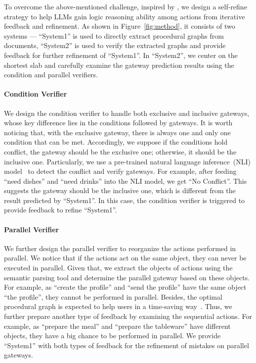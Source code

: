 To overcome the above-mentioned challenge, inspired by \citet{nye2021improving, madaan2023self}, we design a self-refine strategy to help LLMs gain logic reasoning ability among actions from iterative feedback and refinement. As shown in Figure~\ref{fig:method}, it consists of two systems --- ``System1'' is used to directly extract procedural graphs from documents, ``System2'' is used to verify the extracted graphs and provide feedback for further refinement of ``System1''. In ``System2'', we center on the shortest slab and carefully examine the gateway prediction results using the condition and parallel verifiers.

\paragraph{Condition Verifier}
 We design the condition verifier to handle both exclusive and inclusive gateways, whose key difference lies in the conditions followed by gateways. It is worth noticing that, with the exclusive gateway, there is always one and only one condition that can be met. Accordingly, we suppose if the conditions hold conflict, the gateway should be the exclusive one; otherwise, it should be the inclusive one. Particularly, we use a pre-trained natural language inference~(NLI) model~\cite{liu2019roberta} to detect the conflict and verify gateways. For example, after feeding ``need dishes'' and ``need drinks'' into the NLI model, we get ``No Conflict''. This suggests the gateway should be the inclusive one, which is different from the result predicted by ``System1''. In this case, the condition verifier is triggered to provide feedback to refine ``System1''.
%
\paragraph{Parallel Verifier}
 We further design the parallel verifier to reorganize the actions performed in parallel. We notice that if the actions act on the same object, they can never be executed in parallel. Given that, we extract the objects of actions using the semantic parsing tool and determine the parallel gateway based on these objects. For example, as ``create the profile'' and ``send the profile'' have the same object ``the profile'', they cannot be performed in parallel. Besides, the optimal procedural graph is expected to help users in a time-saving way~\cite{miller1979humanistic}. Thus, we further prepare another type of feedback by examining the sequential actions. For example, as ``prepare the meal'' and ``prepare the tableware'' have different objects, they have a big chance to be performed in parallel. We provide ``System1'' with both types of feedback for the refinement of mistakes on parallel gateways.
